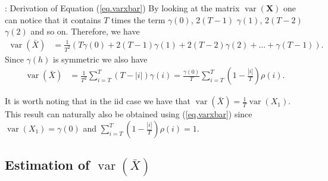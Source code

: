 \documentclass[envcountsect,usenames,dvipsnames]{beamer}
\DeclareMathOperator*{\var}{var}
\theoremstyle{mystyle}
\begin{document}
\begin{frame}{\thesubsection: Derivation of Equation (\ref{eq.varxbar})}
\small
By looking at the matrix $\var \left( \mathbf{X} \right)$ one can notice that it contains $T$ times the term $\gamma(0)$, 2$(T-1)$ $\gamma(1)$, 2$(T-2)$ $\gamma(2)$ and so on. Therefore, we have
%
\begin{equation*}
        \begin{aligned}
            \var \left( {\bar X} \right) &= \frac{1}{T^2} \left(T \gamma(0) + 2(T-1) \gamma(1) + 2(T-2) \gamma(2) + \ldots + \gamma(T-1) \right).
        \end{aligned}
\end{equation*}
%
Since $\gamma(h)$ is symmetric we also have
%
\begin{equation*}
        \begin{aligned}
            \var \left( {\bar X} \right) &= \frac{1}{T^2} \sum_{i = T}^T \left(T - |i|\right) \gamma(i) = \frac{\gamma(0)}{T}  \sum_{i = T}^T \left(1 - \frac{|i|}{T}\right) \rho(i).
        \end{aligned}
\end{equation*}
%


It is worth noting that in the iid case we have that $\var \left( {\bar X} \right) = \frac{1}{T} \var(X_1)$. This result can naturally also be obtained using (\ref{eq.varxbar}) since $\var(X_1) = \gamma(0)$ and  $\sum_{i = T}^T \left(1 - \frac{|i|}{T}\right) \rho(i) = 1$.

\vspace{0.5cm}

\hyperlink{eq.varxbar}{}

\end{frame}


\subsection{Estimation of $\var (\bar{X})$}
\label{app:var:xbar:in:practice}
\end{document}
